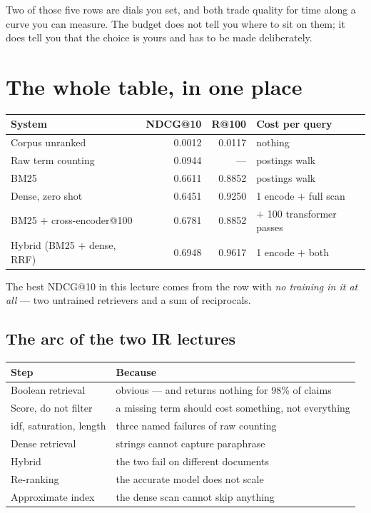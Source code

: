 \documentclass[11pt,a4paper]{article}
\begin{document}
Two of those five rows are dials you set, and both trade quality for time along
a curve you can measure. The budget does not tell you where to sit on them; it
does tell you that the choice is yours and has to be made deliberately.

\section{The whole table, in one place}

\begin{center}
\small
\begin{tabular}{lrrl}
\toprule
\textbf{System} & \textbf{NDCG@10} & \textbf{R@100} & \textbf{Cost per query} \\
\midrule
Corpus unranked            & 0.0012 & 0.0117 & nothing \\
Raw term counting          & 0.0944 & ---    & postings walk \\
BM25                       & 0.6611 & 0.8852 & postings walk \\
Dense, zero shot           & 0.6451 & 0.9250 & 1 encode $+$ full scan \\
BM25 $+$ cross-encoder@100 & 0.6781 & 0.8852 & $+$ 100 transformer passes \\
Hybrid (BM25 $+$ dense, RRF) & 0.6948 & 0.9617 & 1 encode $+$ both \\
\bottomrule
\end{tabular}
\end{center}

The best NDCG@10 in this lecture comes from the row with \emph{no training in
it at all} --- two untrained retrievers and a sum of reciprocals.

\subsection{The arc of the two IR lectures}

\begin{center}
\small
\begin{tabular}{p{}p{}}
\toprule
\textbf{Step} & \textbf{Because} \\
\midrule
Boolean retrieval    & obvious --- and returns nothing for 98\% of claims \\
Score, do not filter & a missing term should cost something, not everything \\
idf, saturation, length & three named failures of raw counting \\
Dense retrieval      & strings cannot capture paraphrase \\
Hybrid               & the two fail on different documents \\
Re-ranking           & the accurate model does not scale \\
Approximate index    & the dense scan cannot skip anything \\
\bottomrule
\end{tabular}
\end{center}
\end{document}
